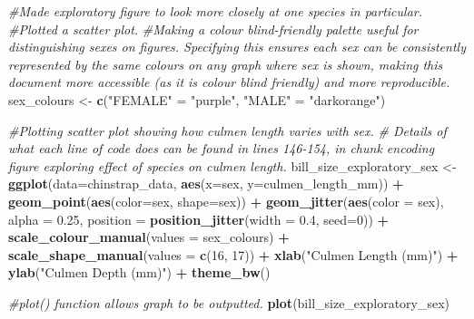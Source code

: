 \documentclass[
]{article}
\newenvironment{Shaded}{\begin{snugshade}}{\end{snugshade}}
\newcommand{\AttributeTok}[1]{\textcolor[rgb]{0.13,0.29,0.53}{#1}}
\newcommand{\CommentTok}[1]{\textcolor[rgb]{0.56,0.35,0.01}{\textit{#1}}}
\newcommand{\DecValTok}[1]{\textcolor[rgb]{0.00,0.00,0.81}{#1}}
\newcommand{\FloatTok}[1]{\textcolor[rgb]{0.00,0.00,0.81}{#1}}
\newcommand{\FunctionTok}[1]{\textcolor[rgb]{0.13,0.29,0.53}{\textbf{#1}}}
\newcommand{\NormalTok}[1]{#1}
\newcommand{\OtherTok}[1]{\textcolor[rgb]{0.56,0.35,0.01}{#1}}
\newcommand{\SpecialCharTok}[1]{\textcolor[rgb]{0.81,0.36,0.00}{\textbf{#1}}}
\newcommand{\StringTok}[1]{\textcolor[rgb]{0.31,0.60,0.02}{#1}}
\begin{document}
\begin{Shaded}
\begin{Highlighting}[]
\CommentTok{\#Made exploratory figure to look more closely at one species in particular.}
\CommentTok{\#Plotted a scatter plot.}
\CommentTok{\#Making a colour blind{-}friendly palette useful for distinguishing sexes on figures. Specifying this ensures each sex can be consistently represented by the same colours on any graph where sex is shown, making this document more accessible (as it is colour blind friendly) and more reproducible.}
\NormalTok{sex\_colours }\OtherTok{\textless{}{-}} \FunctionTok{c}\NormalTok{(}\StringTok{"FEMALE"} \OtherTok{=} \StringTok{"purple"}\NormalTok{,}
                 \StringTok{"MALE"} \OtherTok{=} \StringTok{"darkorange"}\NormalTok{)}

\CommentTok{\#Plotting scatter plot showing how culmen length varies with sex. }
\CommentTok{\# Details of what each line of code does can be found in lines 146{-}154, in chunk encoding figure exploring effect of species on culmen length. }
\NormalTok{bill\_size\_exploratory\_sex }\OtherTok{\textless{}{-}} \FunctionTok{ggplot}\NormalTok{(}\AttributeTok{data=}\NormalTok{chinstrap\_data, }
                         \FunctionTok{aes}\NormalTok{(}\AttributeTok{x=}\NormalTok{sex, }
                            \AttributeTok{y=}\NormalTok{culmen\_length\_mm)) }\SpecialCharTok{+} 
                         \FunctionTok{geom\_point}\NormalTok{(}\FunctionTok{aes}\NormalTok{(}\AttributeTok{color=}\NormalTok{sex, }\AttributeTok{shape=}\NormalTok{sex)) }\SpecialCharTok{+} 
                         \FunctionTok{geom\_jitter}\NormalTok{(}\FunctionTok{aes}\NormalTok{(}\AttributeTok{color =}\NormalTok{ sex), }\AttributeTok{alpha =} \FloatTok{0.25}\NormalTok{, }\AttributeTok{position =}                                                                   \FunctionTok{position\_jitter}\NormalTok{(}\AttributeTok{width =} \FloatTok{0.4}\NormalTok{, }\AttributeTok{seed=}\DecValTok{0}\NormalTok{)) }\SpecialCharTok{+}
                         \FunctionTok{scale\_colour\_manual}\NormalTok{(}\AttributeTok{values =}\NormalTok{ sex\_colours) }\SpecialCharTok{+} 
                         \FunctionTok{scale\_shape\_manual}\NormalTok{(}\AttributeTok{values =} \FunctionTok{c}\NormalTok{(}\DecValTok{16}\NormalTok{, }\DecValTok{17}\NormalTok{)) }\SpecialCharTok{+}
                         \FunctionTok{xlab}\NormalTok{(}\StringTok{"Culmen Length (mm)"}\NormalTok{) }\SpecialCharTok{+} 
                         \FunctionTok{ylab}\NormalTok{(}\StringTok{"Culmen Depth (mm)"}\NormalTok{) }\SpecialCharTok{+}
                         \FunctionTok{theme\_bw}\NormalTok{()}

\CommentTok{\#plot() function allows graph to be outputted.}
\FunctionTok{plot}\NormalTok{(bill\_size\_exploratory\_sex)}
\end{Highlighting}
\end{Shaded}
\end{document}
